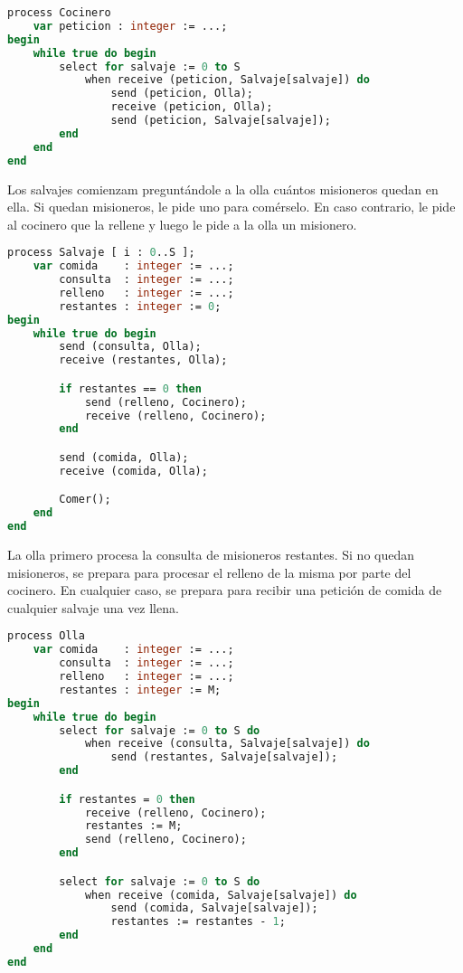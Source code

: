 \begin{lstlisting}[language=Pascal]
process Cocinero
	var peticion : integer := ...;
begin
	while true do begin
		select for salvaje := 0 to S
			when receive (peticion, Salvaje[salvaje]) do
				send (peticion, Olla);
				receive (peticion, Olla);
				send (peticion, Salvaje[salvaje]);
		end
	end
end
\end{lstlisting}

Los salvajes comienzam preguntándole a la olla cuántos misioneros quedan en ella.
Si quedan misioneros, le pide uno para comérselo.
En caso contrario, le pide al cocinero que la rellene y luego le pide a la olla un misionero.

\begin{lstlisting}[language=Pascal]
process Salvaje [ i : 0..S ];
	var comida    : integer := ...;
	    consulta  : integer := ...;
	    relleno   : integer := ...;
	    restantes : integer := 0;
begin
	while true do begin
		send (consulta, Olla);
		receive (restantes, Olla);

		if restantes == 0 then
			send (relleno, Cocinero);
			receive (relleno, Cocinero);
		end

		send (comida, Olla);
		receive (comida, Olla);

		Comer();
	end
end
\end{lstlisting}

La olla primero procesa la consulta de misioneros restantes.
Si no quedan misioneros, se prepara para procesar el relleno de la misma por parte del cocinero.
En cualquier caso, se prepara para recibir una petición de comida de cualquier salvaje una vez llena.

\begin{lstlisting}[language=Pascal]
process Olla
	var comida    : integer := ...;
	    consulta  : integer := ...;
	    relleno   : integer := ...;
	    restantes : integer := M;
begin
	while true do begin
		select for salvaje := 0 to S do
			when receive (consulta, Salvaje[salvaje]) do
				send (restantes, Salvaje[salvaje]);
		end

		if restantes = 0 then
			receive (relleno, Cocinero);
			restantes := M;
			send (relleno, Cocinero);
		end

		select for salvaje := 0 to S do
			when receive (comida, Salvaje[salvaje]) do
				send (comida, Salvaje[salvaje]);
				restantes := restantes - 1;
		end
	end
end
\end{lstlisting}
